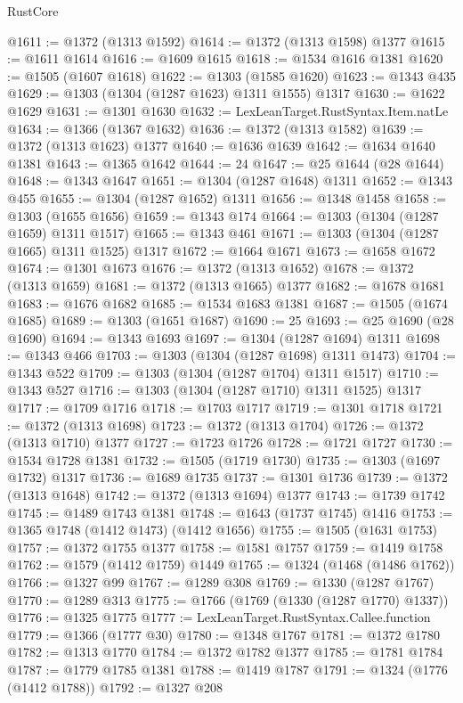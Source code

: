 \begin{lexlean}{RustCore}
\begin{coremodule}
@1611 := @1372 (@1313 @1592)
@1614 := @1372 (@1313 @1598) @1377
@1615 := @1611 @1614
@1616 := @1609 @1615
@1618 := @1534 @1616 @1381
@1620 := @1505 (@1607 @1618)
@1622 := @1303 (@1585 @1620)
@1623 := @1343 @435
@1629 := @1303 (@1304 (@1287 @1623) @1311 @1555) @1317
@1630 := @1622 @1629
@1631 := @1301 @1630
@1632 := LexLeanTarget.RustSyntax.Item.natLe
@1634 := @1366 (@1367 @1632)
@1636 := @1372 (@1313 @1582)
@1639 := @1372 (@1313 @1623) @1377
@1640 := @1636 @1639
@1642 := @1634 @1640 @1381
@1643 := @1365 @1642
@1644 := 24
@1647 := @25 @1644 (@28 @1644)
@1648 := @1343 @1647
@1651 := @1304 (@1287 @1648) @1311
@1652 := @1343 @455
@1655 := @1304 (@1287 @1652) @1311
@1656 := @1348 @1458
@1658 := @1303 (@1655 @1656)
@1659 := @1343 @174
@1664 := @1303 (@1304 (@1287 @1659) @1311 @1517)
@1665 := @1343 @461
@1671 := @1303 (@1304 (@1287 @1665) @1311 @1525) @1317
@1672 := @1664 @1671
@1673 := @1658 @1672
@1674 := @1301 @1673
@1676 := @1372 (@1313 @1652)
@1678 := @1372 (@1313 @1659)
@1681 := @1372 (@1313 @1665) @1377
@1682 := @1678 @1681
@1683 := @1676 @1682
@1685 := @1534 @1683 @1381
@1687 := @1505 (@1674 @1685)
@1689 := @1303 (@1651 @1687)
@1690 := 25
@1693 := @25 @1690 (@28 @1690)
@1694 := @1343 @1693
@1697 := @1304 (@1287 @1694) @1311
@1698 := @1343 @466
@1703 := @1303 (@1304 (@1287 @1698) @1311 @1473)
@1704 := @1343 @522
@1709 := @1303 (@1304 (@1287 @1704) @1311 @1517)
@1710 := @1343 @527
@1716 := @1303 (@1304 (@1287 @1710) @1311 @1525) @1317
@1717 := @1709 @1716
@1718 := @1703 @1717
@1719 := @1301 @1718
@1721 := @1372 (@1313 @1698)
@1723 := @1372 (@1313 @1704)
@1726 := @1372 (@1313 @1710) @1377
@1727 := @1723 @1726
@1728 := @1721 @1727
@1730 := @1534 @1728 @1381
@1732 := @1505 (@1719 @1730)
@1735 := @1303 (@1697 @1732) @1317
@1736 := @1689 @1735
@1737 := @1301 @1736
@1739 := @1372 (@1313 @1648)
@1742 := @1372 (@1313 @1694) @1377
@1743 := @1739 @1742
@1745 := @1489 @1743 @1381
@1748 := @1643 (@1737 @1745) @1416
@1753 := @1365 @1748 (@1412 @1473) (@1412 @1656)
@1755 := @1505 (@1631 @1753)
@1757 := @1372 @1755 @1377
@1758 := @1581 @1757
@1759 := @1419 @1758
@1762 := @1579 (@1412 @1759) @1449
@1765 := @1324 (@1468 (@1486 @1762))
@1766 := @1327 @99
@1767 := @1289 @308
@1769 := @1330 (@1287 @1767)
@1770 := @1289 @313
@1775 := @1766 (@1769 (@1330 (@1287 @1770) @1337))
@1776 := @1325 @1775
@1777 := LexLeanTarget.RustSyntax.Callee.function
@1779 := @1366 (@1777 @30)
@1780 := @1348 @1767
@1781 := @1372 @1780
@1782 := @1313 @1770
@1784 := @1372 @1782 @1377
@1785 := @1781 @1784
@1787 := @1779 @1785 @1381
@1788 := @1419 @1787
@1791 := @1324 (@1776 (@1412 @1788))
@1792 := @1327 @208

\end{coremodule}
\end{lexlean}
